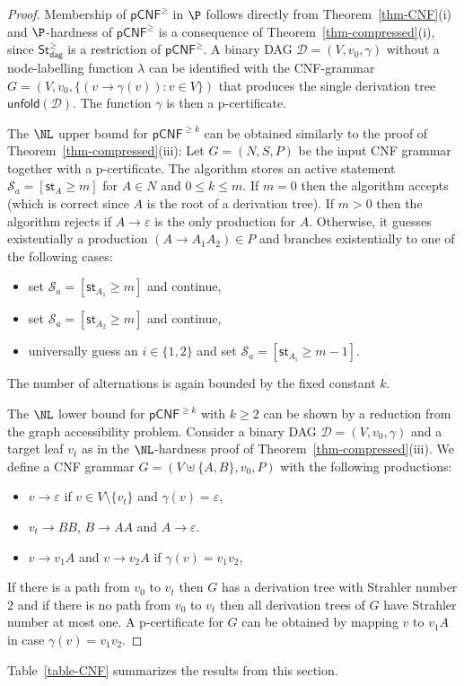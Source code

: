 \documentclass[a4paper,UKenglish,cleveref, autoref, thm-restate, numberwithinsect]{lipics-v2021}
\newcommand{\hs}{\mathsf{st}}
\newcommand{\unfold}{\mathsf{unfold}}
\newcommand{\rCNF}{\mathsf{pCNF}}
\newcommand{\StN}{\mathsf{St}^\ge}
\newcommand{\StNdag}{\StN_{\mathsf{dag}}}
\begin{document}
\begin{proof}
Membership of $\rCNF^{\ge}$ in $\P$ follows directly from Theorem~\ref{thm-CNF}(i) and 
$\P$-hardness of $\rCNF^\ge$ is a consequence of Theorem~\ref{thm-compressed}(i), since $\StNdag$ is a restriction of $\rCNF^\ge$. 
A binary DAG $\mathcal{D} = (V,v_0,\gamma)$ without a node-labelling function $\lambda$
can be identified with the CNF-grammar $G = (V, v_0, \{ (v \to \gamma(v)) : v \in V\})$
 that produces the single derivation tree $\unfold(\mathcal{D})$. The function $\gamma$ is then a p-certificate.

The $\NL$ upper bound for $\rCNF^{\ge k}$ can be obtained similarly 
 to the proof of Theorem~\ref{thm-compressed}(iii): Let $G = (N,S,P)$ be the input CNF grammar together with a p-certificate.
The algorithm stores an active statement $\mathcal{S}_a = [\hs_A \geq m]$ for $A \in N$ and $0 \le k \le m$. 
If $m=0$ then the algorithm accepts (which is correct since $A$ is the root of a derivation tree).
If $m > 0$ then the algorithm rejects if $A \to \varepsilon$ is the only production for $A$. Otherwise, it
guesses existentially a production $(A \to A_1 A_2) \in P$ and branches
existentially to one of the following cases:
 \begin{itemize}
\item set $\mathcal{S}_a = [\hs_{A_1} \geq m]$ and continue,
\item set $\mathcal{S}_a = [\hs_{A_2} \geq m]$ and continue,
\item universally guess an $i \in \{1,2\}$ and set $\mathcal{S}_a = [\hs_{A_i} \geq m-1]$.
\end{itemize}
The number of alternations is again bounded by the fixed constant $k$.

The $\NL$ lower bound for $\rCNF^{\ge k}$ with $k \geq 2$
can be shown by a reduction from the graph accessibility problem. 
Consider a binary DAG $\mathcal{D} = (V, v_0, \gamma)$ and a target leaf $v_t$
as in the $\NL$-hardness proof of 
Theorem~\ref{thm-compressed}(iii). We define a CNF grammar $G = (V \uplus \{A,B\}, v_0, P)$
with the following productions:
\begin{itemize}
\item $v \to \varepsilon$ if $v \in V \setminus \{v_t\}$ and $\gamma(v) = \varepsilon$,
\item $v_t \to BB$, $B \to AA$ and $A \to \varepsilon$.
\item $v \to v_1 A$ and $v \to v_2 A$ if $\gamma(v) = v_1 v_2$,
\end{itemize}
If there is a path from $v_0$ to $v_t$ then $G$ has a derivation tree with Strahler number $2$ and
if there is no path from $v_0$ to $v_t$ then all derivation trees of $G$ have Strahler number at most one.
A p-certificate for $G$ can be obtained by mapping $v$ to $v_1 A$ in case $\gamma(v) = v_1 v_2$.
\end{proof}
Table~\ref{table-CNF} summarizes the results from this section.
\end{document}
